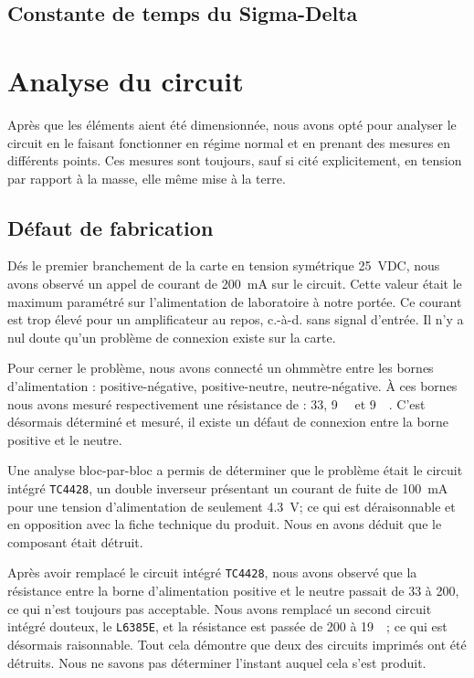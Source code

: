 \documentclass[10pt, oneside, a4paper]{article}
\begin{document}
\subsection{Constante de temps du Sigma-Delta}


\section{Analyse du circuit}
Après que les éléments aient été dimensionnée, nous avons opté pour analyser le circuit en le faisant fonctionner en régime normal et en prenant des mesures en différents points.
Ces mesures sont toujours, sauf si cité explicitement, en tension par rapport à la masse, elle même mise à la terre.

\subsection{Défaut de fabrication}
Dés le premier branchement de la carte en tension symétrique \pm\SI{25}{\volt}DC,
nous avons observé un appel de courant de \SI{200}{\milli\ampere} sur le circuit.
Cette valeur était le maximum paramétré sur l'alimentation de laboratoire à notre portée.
Ce courant est trop élevé pour un amplificateur au repos, c.-à-d. sans signal d'entrée.
Il n'y a nul doute qu'un problème de connexion existe sur la carte.

Pour cerner le problème, nous avons connecté un ohmmètre entre les bornes d'alimentation : positive-négative, positive-neutre, neutre-négative.
À ces bornes nous avons mesuré respectivement une résistance de : \SI{33}{\Omega}, \SI{9}{\kilo\Omega} et \SI{9}{\kilo\Omega}.
C'est désormais déterminé et mesuré, il existe un défaut de connexion entre la borne positive et le neutre.

Une analyse bloc-par-bloc a permis de déterminer que le problème était le circuit intégré \verb|TC4428|, un double inverseur présentant un courant de fuite de \SI{100}{\milli\ampere} pour une tension d'alimentation de seulement \SI{4.3}{\volt};
ce qui est déraisonnable et en opposition avec la fiche technique du produit.
Nous en avons déduit que le composant était détruit.

Après avoir remplacé le circuit intégré \verb|TC4428|, nous avons observé que la résistance entre la borne d'alimentation positive et le neutre passait de \SI{33}{\Omega} à \SI{200}{\Omega}, ce qui n'est toujours pas acceptable.
Nous avons remplacé un second circuit intégré douteux, le \verb|L6385E|, et la résistance est passée de \SI{200}{\Omega} à \SI{19}{\kilo\Omega}; ce qui est désormais raisonnable.
Tout cela démontre que deux des circuits imprimés ont été détruits.
Nous ne savons pas déterminer l'instant auquel cela s'est produit.
\end{document}
